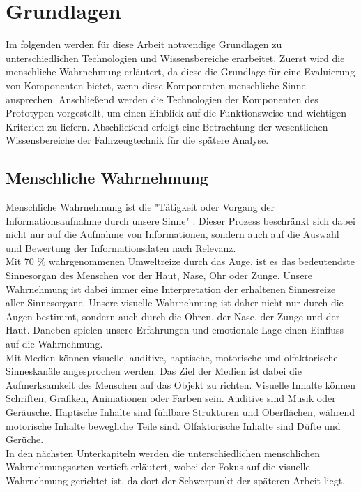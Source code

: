\chapter{Grundlagen}
\label{cha:Grundlagen}
Im folgenden werden für diese Arbeit notwendige Grundlagen zu unterschiedlichen Technologien und Wissensbereiche erarbeitet. Zuerst wird die menschliche Wahrnehmung erläutert, da diese die Grundlage für eine Evaluierung von Komponenten bietet, wenn diese Komponenten menschliche Sinne ansprechen. Anschließend werden die Technologien der Komponenten des Prototypen vorgestellt, um einen Einblick auf die Funktionsweise und wichtigen Kriterien zu liefern. Abschließend erfolgt eine Betrachtung der wesentlichen Wissensbereiche der Fahrzeugtechnik für die spätere Analyse.
\section{Menschliche Wahrnehmung}
Menschliche Wahrnehmung ist die "Tätigkeit oder Vorgang der Informationsaufnahme durch unsere Sinne" \cite[Seite 12]{Buhler.2017}. Dieser Prozess beschränkt sich dabei nicht nur auf die Aufnahme von Informationen, sondern auch auf die Auswahl und Bewertung der Informationsdaten nach Relevanz. \cite[Vgl. Seite 12]{Buhler.2017}\\
Mit 70 \% wahrgenommenen Umweltreize durch das Auge, ist es das bedeutendste Sinnesorgan des Menschen vor der Haut, Nase, Ohr oder Zunge. Unsere Wahrnehmung ist dabei immer eine Interpretation der erhaltenen Sinnesreize aller Sinnesorgane. Unsere visuelle Wahrnehmung ist daher nicht nur durch die Augen bestimmt, sondern auch durch die Ohren, der Nase, der Zunge und der Haut. Daneben spielen unsere Erfahrungen und emotionale Lage einen Einfluss auf die Wahrnehmung. \cite[Vgl. Seite 13 f.]{Buhler.2017}\\
Mit Medien können visuelle, auditive, haptische, motorische und olfaktorische Sinneskanäle angesprochen werden. Das Ziel der Medien ist dabei die Aufmerksamkeit des Menschen auf das Objekt zu richten. Visuelle Inhalte können Schriften, Grafiken, Animationen oder Farben sein. Auditive sind Musik oder Geräusche. Haptische Inhalte sind fühlbare Strukturen und Oberflächen, während motorische Inhalte bewegliche Teile sind. Olfaktorische Inhalte sind Düfte und Gerüche. \cite[Vgl. Seite 3]{Buhler.2017}\\
In den nächsten Unterkapiteln werden die unterschiedlichen menschlichen Wahrnehmungsarten vertieft erläutert, wobei der Fokus auf die visuelle Wahrnehmung gerichtet ist, da dort der Schwerpunkt der späteren Arbeit liegt.
